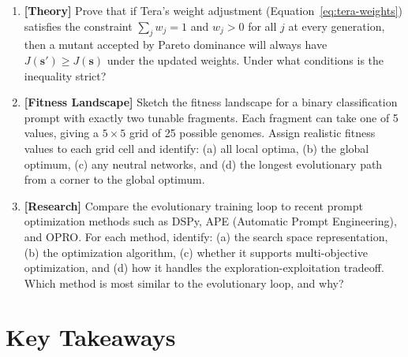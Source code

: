 \begin{enumerate}[label=\textbf{12.\arabic*.}, leftmargin=2.5em]
\item \textbf{[Theory]} Prove that if Tera's weight adjustment (Equation~\ref{eq:tera-weights}) satisfies the constraint $\sum_j w_j = 1$ and $w_j > 0$ for all $j$ at every generation, then a mutant accepted by Pareto dominance will always have $J(\mathbf{s}') \geq J(\mathbf{s})$ under the updated weights. Under what conditions is the inequality strict?

\item \textbf{[Fitness Landscape]} Sketch the fitness landscape for a binary classification prompt with exactly two tunable fragments. Each fragment can take one of 5 values, giving a $5 \times 5$ grid of 25 possible genomes. Assign realistic fitness values to each grid cell and identify: (a) all local optima, (b) the global optimum, (c) any neutral networks, and (d) the longest evolutionary path from a corner to the global optimum.

\item \textbf{[Research]} Compare the evolutionary training loop to recent prompt optimization methods such as DSPy, APE (Automatic Prompt Engineering), and OPRO. For each method, identify: (a) the search space representation, (b) the optimization algorithm, (c) whether it supports multi-objective optimization, and (d) how it handles the exploration-exploitation tradeoff. Which method is most similar to the evolutionary loop, and why?

\end{enumerate}

\section{Key Takeaways}

